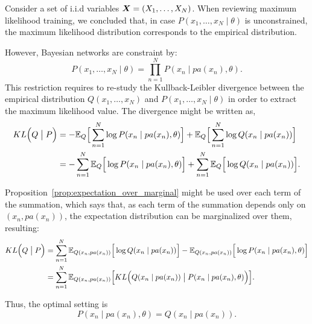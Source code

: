 
Consider a set of i.i.d variables \(\bm{X} = (X_{1},\dots,X_{N})\). When reviewing maximum likelihood training, we concluded that, in case \(P(x_{1},\dots, x_{N} \mid \theta)\) is unconstrained, the maximum likelihood distribution corresponds to the empirical distribution.

However, Bayesian networks are constraint by:
 \[
   P(x_{1}, \dots, x_{N} \mid \theta) = \prod_{n = 1}^N P(x_n  \mid  pa(x_n), \theta).
 \]
This restriction requires to re-study the Kullback-Leibler divergence between the empirical
 distribution \(Q(x_1,\dots,x_N)\) and \(P(x_1, \dots, x_N \mid \theta)\) in order to extract the maximum likelihood value. The divergence might be written as,
 \[
   \begin{aligned}
   KL\Big(Q \bigm| P\Big) &= - \mathbb{E}_{Q}\Big[\sum_{n = 1}^N\log{P(x_n \mid pa(x_n), \theta)}\Big] +
   \mathbb{E}_{Q}\Big[\sum_{n = 1}^N\log{Q(x_n \mid pa(x_n))}\Big]
   \\ &= - \sum_{n = 1}^N \mathbb{E}_{Q}\Big[\log{P(x_n \mid pa(x_n), \theta)}\Big] + \sum_{n =
     1}^N \mathbb{E}_{Q}\Big[\log{Q(x_n \mid pa(x_n))}\Big].
   \end{aligned}
 \]

Proposition~\ref{prop:expectation_over_marginal} might be used over each term of the summation, which says that, as each term of the summation depends only on \((x_{n}, pa(x_{n}))\), the expectation distribution can be marginalized over them, resulting:
 \[
   \begin{aligned}
     KL\Big(Q \bigm| P\Big) &= \sum_{n = 1}^N \mathbb{E}_{Q(x_n,pa(x_n))}\Big[\log{Q(x_n \mid pa(x_n))}\Big] - \mathbb{E}_{Q(x_n,pa(x_n))}\Big[\log{P(x_n \mid pa(x_n), \theta)}\Big]\\
     &= \sum_{n = 1}^N \mathbb{E}_{Q(x_n,pa(x_n))}\Big[KL\Big(Q(x_n \mid pa(x_n)) \bigm| P(x_n \mid pa(x_n), \theta)\Big)\Big].
   \end{aligned}
 \]

 Thus, the optimal setting is
 \[
   P(x_n \mid pa(x_n), \theta) = Q(x_n \mid pa(x_n)).
 \]
